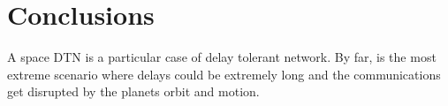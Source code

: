 \section{Conclusions}

A space DTN is a particular case of delay tolerant network. By far, is the most extreme scenario where delays could be extremely long and the communications get disrupted by the planets orbit and motion.

